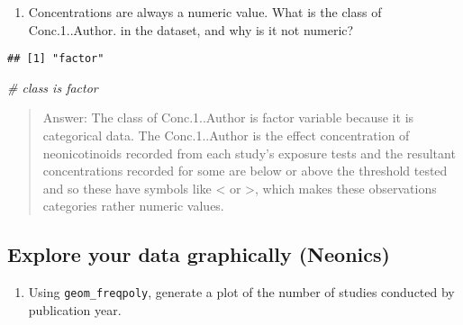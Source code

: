 \documentclass[
]{article}
\newenvironment{Shaded}{\begin{snugshade}}{\end{snugshade}}
\newcommand{\CommentTok}[1]{\textcolor[rgb]{0.56,0.35,0.01}{\textit{#1}}}
\newcommand{\DecValTok}[1]{\textcolor[rgb]{0.00,0.00,0.81}{#1}}
\newcommand{\FunctionTok}[1]{\textcolor[rgb]{0.00,0.00,0.00}{#1}}
\newcommand{\NormalTok}[1]{#1}
\newcommand{\SpecialCharTok}[1]{\textcolor[rgb]{0.00,0.00,0.00}{#1}}
\providecommand{\tightlist}{%
  \setlength{\itemsep}{0pt}\setlength{\parskip}{0pt}}
\begin{document}
\begin{enumerate}
\def\labelenumi{\arabic{enumi}.}
\setcounter{enumi}{7}
\tightlist
\item
  Concentrations are always a numeric value. What is the class of
  Conc.1..Author. in the dataset, and why is it not numeric?
\end{enumerate}

\begin{Shaded}
\end{Shaded}

\begin{verbatim}
## [1] "factor"
\end{verbatim}

\begin{Shaded}
\begin{Highlighting}[]
\CommentTok{\# class is factor}
\end{Highlighting}
\end{Shaded}

\begin{quote}
Answer: The class of Conc.1..Author is factor variable because it is
categorical data. The Conc.1..Author is the effect concentration of
neonicotinoids recorded from each study's exposure tests and the
resultant concentrations recorded for some are below or above the
threshold tested and so these have symbols like \textless{} or
\textgreater, which makes these observations categories rather numeric
values.
\end{quote}

\hypertarget{explore-your-data-graphically-neonics}{%
\subsection{Explore your data graphically
(Neonics)}\label{explore-your-data-graphically-neonics}}

\begin{enumerate}
\def\labelenumi{\arabic{enumi}.}
\setcounter{enumi}{8}
\tightlist
\item
  Using \texttt{geom\_freqpoly}, generate a plot of the number of
  studies conducted by publication year.
\end{enumerate}
\end{document}
